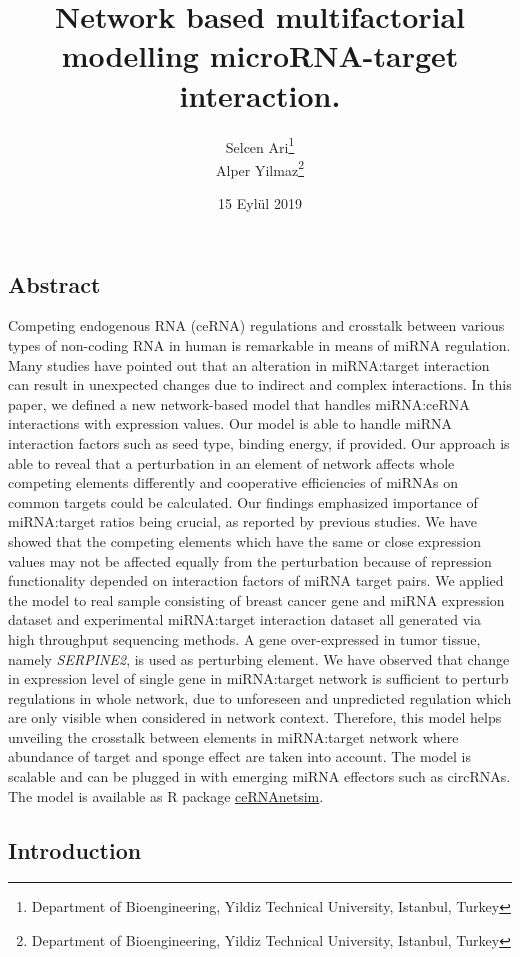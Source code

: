\documentclass[]{article}
\title{Network based multifactorial modelling microRNA-target interaction.}
\author{Selcen Ari\footnote{Department of Bioengineering, Yildiz Technical
  University, Istanbul, Turkey} \\ Alper Yilmaz\footnote{Department of Bioengineering, Yildiz Technical
  University, Istanbul, Turkey}}
\date{15 Eylül 2019}
\begin{document}
\maketitle

\hypertarget{abstract}{%
\subsection{Abstract}\label{abstract}}

Competing endogenous RNA (ceRNA) regulations and crosstalk between
various types of non-coding RNA in human is remarkable in means of miRNA
regulation. Many studies have pointed out that an alteration in
miRNA:target interaction can result in unexpected changes due to
indirect and complex interactions. In this paper, we defined a new
network-based model that handles miRNA:ceRNA interactions with
expression values. Our model is able to handle miRNA interaction factors
such as seed type, binding energy, if provided. Our approach is able to
reveal that a perturbation in an element of network affects whole
competing elements differently and cooperative efficiencies of miRNAs on
common targets could be calculated. Our findings emphasized importance
of miRNA:target ratios being crucial, as reported by previous studies.
We have showed that the competing elements which have the same or close
expression values may not be affected equally from the perturbation
because of repression functionality depended on interaction factors of
miRNA target pairs. We applied the model to real sample consisting of
breast cancer gene and miRNA expression dataset and experimental
miRNA:target interaction dataset all generated via high throughput
sequencing methods. A gene over-expressed in tumor tissue, namely
\emph{SERPINE2}, is used as perturbing element. We have observed that
change in expression level of single gene in miRNA:target network is
sufficient to perturb regulations in whole network, due to unforeseen
and unpredicted regulation which are only visible when considered in
network context. Therefore, this model helps unveiling the crosstalk
between elements in miRNA:target network where abundance of target and
sponge effect are taken into account. The model is scalable and can be
plugged in with emerging miRNA effectors such as circRNAs. The model is
available as R package
\href{https://github.com/selcenari/ceRNAnetsim}{ceRNAnetsim}.

\hypertarget{introduction}{%
\subsection{Introduction}\label{introduction}}
\end{document}
